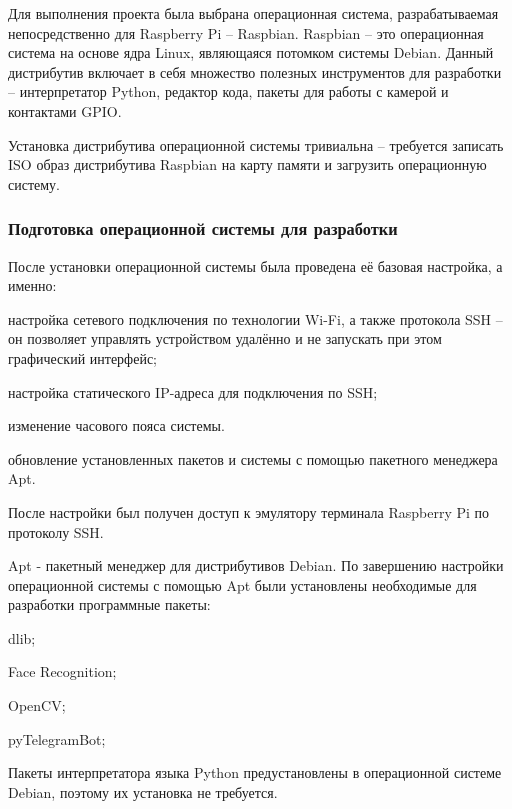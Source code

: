 Для выполнения проекта была выбрана операционная система, разрабатываемая непосредственно для Raspberry Pi -- Raspbian. Raspbian -- это операционная система на основе ядра Linux, являющаяся потомком системы Debian. Данный дистрибутив включает в себя множество полезных инструментов для разработки -- интерпретатор Python, редактор кода, пакеты для работы с камерой и контактами GPIO. 

Установка дистрибутива операционной системы тривиальна -- требуется записать ISO образ дистрибутива Raspbian на карту памяти и загрузить операционную систему.

\subsubsection{Подготовка операционной системы для разработки}
После установки операционной системы была проведена её базовая настройка, а именно:
\begin{itemize*}
\item настройка сетевого подключения по технологии Wi-Fi, а также протокола SSH -- он позволяет управлять устройством удалённо и не запускать при этом графический интерфейс; 
\item настройка статического IP-адреса для подключения по SSH; 
\item изменение часового пояса системы.
\item обновление установленных пакетов и системы с помощью пакетного менеджера Apt.
\end{itemize*}

После настройки был получен доступ к эмулятору терминала Raspberry Pi по протоколу SSH.


Apt - пакетный менеджер для дистрибутивов Debian. По завершению настройки операционной системы с помощью Apt были установлены необходимые для разработки программные пакеты:
\begin{itemize*}
\item dlib;
\item Face Recognition;
\item OpenCV;
\item pyTelegramBot;
\end{itemize*}

Пакеты интерпретатора языка Python предустановлены в операционной системе
Debian, поэтому их установка не требуется.
